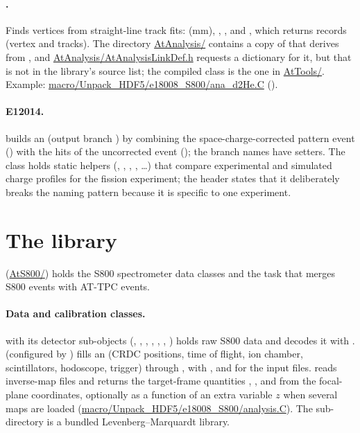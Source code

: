 \paragraph{.}
Finds vertices from straight-line track fits:  (mm),
, , and , which
returns  records (vertex and tracks). The directory \url{AtAnalysis/} contains a copy of
 that derives from , and \url{AtAnalysis/AtAnalysisLinkDef.h} requests a
dictionary for it, but that  is not in the library's source list; the compiled class is the one in
\url{AtTools/}. Example: \url{macro/Unpack_HDF5/e18008_S800/ana_d2He.C} ().

\paragraph{E12014.}
 builds an  (output branch ) by combining
the space-charge-corrected pattern event () with the hits of the uncorrected event
(); the branch names have setters. The class  holds static helpers (,
, , , \ldots) that compare experimental and simulated charge
profiles for the fission experiment; the header states that it deliberately breaks the  naming pattern because
it is specific to one experiment.

\section{The  library}

 (\url{AtS800/}) holds the S800 spectrometer data classes and the task that merges S800 events with
AT-TPC events.

\paragraph{Data and calibration classes.}
 with its detector sub-objects (, , ,
, , , ) holds raw S800 data and decodes it with
.  (configured by ) fills an  (CRDC
positions, time of flight, ion chamber, scintillators, hodoscope, trigger) through , with ,  and  for the input files.
 reads inverse-map files and returns the target-frame quantities , , 
and  from the focal-plane coordinates, optionally as a function of an extra variable $z$ when several maps
are loaded (\url{macro/Unpack_HDF5/e18008_S800/analysis.C}). The  sub-directory is a bundled
Levenberg--Marquardt library.

